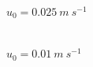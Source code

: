\documentclass[serif,compress, blue, 11pt]{beamer}
\begin{document}
{\begin{figure}
\begin{minipage}{0.47\linewidth}
\tiny{$u_0=0.025\ m\ s^{-1}$}
\end{minipage}
\begin{minipage}{0.47\linewidth}
 \\
\tiny{$u_0=0.01\ m\ s^{-1}$}
\end{minipage}
\end{figure}
}


\end{document}
